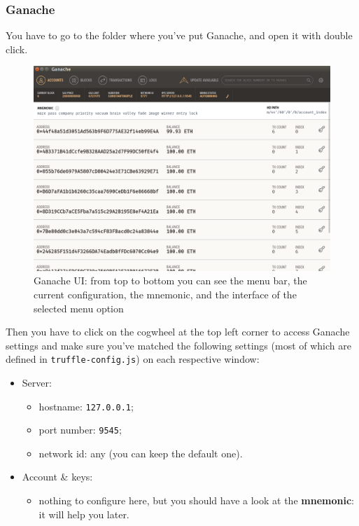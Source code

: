 \subsubsection{Ganache}
You have to go to the folder where you've put Ganache, and open it with double click.
\begin{figure}
	\centering
	\includegraphics[scale=0.25]{res/images/ganache-ui.png}
	\caption{Ganache UI: from top to bottom you can see the menu bar, the current configuration, the mnemonic, and the interface of the selected menu option}
\end{figure}
Then you have to click on the cogwheel at the top left corner to access Ganache settings and make sure you've matched the following settings (most of which are defined in \texttt{truffle-config.js}) on each respective window:
\begin{itemize}
	\item Server:
	\begin{itemize}
		\item hostname: \texttt{127.0.0.1};
		\item port number: \texttt{9545};
		\item network id: any (you can keep the default one).
	\end{itemize}
	\item Account \& keys\glo:
	\begin{itemize}
		\item nothing to configure here, but you should have a look at the \textbf{mnemonic}: it will help you later.
	\end{itemize}
\end{itemize}

